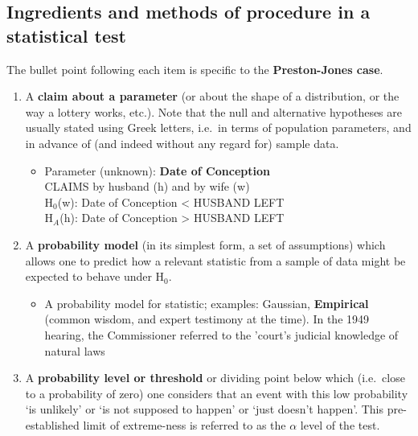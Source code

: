 \documentclass[]{book}
\providecommand{\tightlist}{%
  \setlength{\itemsep}{0pt}\setlength{\parskip}{0pt}}
\begin{document}
\hypertarget{ingredients-and-methods-of-procedure-in-a-statistical-test}{%
\subsection{Ingredients and methods of procedure in a statistical test}\label{ingredients-and-methods-of-procedure-in-a-statistical-test}}

The bullet point following each item is specific to the \textbf{Preston-Jones case}.

\begin{enumerate}
\def\labelenumi{\arabic{enumi}.}
\tightlist
\item
  A \textbf{claim about a parameter} (or about the shape of a distribution,
  or the way a lottery works, etc.). Note that the null and alternative hypotheses are usually stated using Greek letters, i.e.~in terms of population parameters, and in advance of (and indeed without any regard for) sample data.

  \begin{itemize}
  \tightlist
  \item
    Parameter (unknown): \textbf{Date of Conception}\\
    CLAIMS by husband (h) and by wife (w)\\
    H\(_0\)(w): Date of Conception \textless{} HUSBAND LEFT\\
    H\(_A\)(h): Date of Conception \textgreater{} HUSBAND LEFT
  \end{itemize}
\item
  A \textbf{probability model} (in its simplest form, a set of assumptions) which allows one to predict how a relevant statistic from a sample
  of data might be expected to behave under H\(_0\).

  \begin{itemize}
  \tightlist
  \item
    A probability model for statistic; examples: Gaussian, \textbf{Empirical} (common wisdom, and expert testimony at the time). In the 1949 hearing, the Commissioner referred to the 'court's judicial knowledge of natural laws
  \end{itemize}
\item
  A \textbf{probability level or threshold} or dividing point below which (i.e.~close to a probability of zero) one considers that an event with this low probability `is unlikely' or `is not supposed to
  happen' or `just doesn't happen'. This pre-established limit of extreme-ness is referred to as the \(\alpha\) level of the test.


\end{enumerate}
\end{document}
